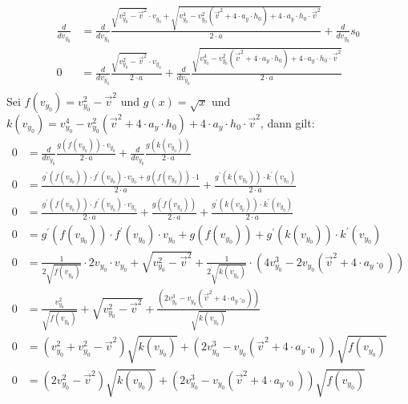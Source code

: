 \documentclass[sectionformat = aufgabe]{gadsescript}
\begin{document}
\begin{enumerate}[label=\alph*)]
		\begin{align*}
			\frac{d}{dv_{y_0}} &= \frac{d}{dv_{y_0}}  \frac{\sqrt{v_{y_0}^2 - \vec v^2 } \cdot v_{y_0} + \sqrt{v_{y_0}^4 - v_{y_0}^2 \left( \vec v^2 + 4 \cdot a_y \cdot h_0 \right) + 4\cdot a_y\cdot h_0 \cdot \vec v^2}}{2\cdot a} + \frac{d}{dv_{y_0}}s_0\\
			0 &= \frac{d}{dv_{y_0}}  \frac{\sqrt{v_{y_0}^2 - \vec v^2 } \cdot v_{y_0}}{2\cdot a} + \frac{d}{dv_{y_0}}\frac{\sqrt{v_{y_0}^4 - v_{y_0}^2 \left( \vec v^2 + 4 \cdot a_y \cdot h_0 \right) + 4\cdot a_y\cdot h_0 \cdot \vec v^2}}{2\cdot a} \\
		\end{align*}
		Sei $ f(v_{y_0}) = v_{y_0}^2 - \vec v^2 $ und $ g(x) = \sqrt{x} $ und $ k(v_{y_0}) = {v_{y_0}^4 - v_{y_0}^2 \left( \vec v^2 + 4 \cdot a_y \cdot h_0 \right) + 4\cdot a_y\cdot h_0 \cdot \vec v^2} $, dann gilt:
		\begin{align*}
			0 &= \frac{d}{dv_{y_0}}  \frac{g(f(v_{y_0})) \cdot v_{y_0}}{2\cdot a} + \frac{d}{dv_{y_0}}\frac{g(k(v_{y_0})) }{2\cdot a} \\
			0 &=  \frac{g^\prime(f(v_{y_0}))\cdot f^\prime(v_{y_0}) \cdot v_{y_0} + g(f(v_{y_0})) \cdot 1}{2\cdot a} + \frac{g^\prime(k(v_{y_0}))\cdot k^\prime(v_{y_0}) }{2\cdot a} \\
			0 &=  \frac{g^\prime(f(v_{y_0}))\cdot f^\prime(v_{y_0}) \cdot v_{y_0}}{2\cdot a} + \frac{g(f(v_{y_0})) }{2\cdot a} + \frac{g^\prime(k(v_{y_0}))\cdot k^\prime(v_{y_0}) }{2\cdot a} \\
			0 &=  g^\prime(f(v_{y_0}))\cdot f^\prime(v_{y_0}) \cdot v_{y_0} + g(f(v_{y_0})) + g^\prime(k(v_{y_0}))\cdot k^\prime(v_{y_0})  \\
			0 &=  \frac{1}{2\sqrt{f(v_{y_0})}}\cdot 2v_{y_0} \cdot v_{y_0} + \sqrt{v_{y_0}^2 - \vec v^2} + \frac{1}{2 \sqrt{k(v_{y_0})}} \cdot (4 v_{y_0}^3 - 2v_{y_0} \left ( \vec v ^2 + 4 \cdot a_y \cdot_0 \right))  \\
			0 &=  \frac{v_{y_0}^2}{\sqrt{f(v_{y_0})}} + \sqrt{v_{y_0}^2 - \vec v^2} + \frac{(2 v_{y_0}^3 - v_{y_0} \left ( \vec v ^2 + 4 \cdot a_y \cdot_0 \right))}{\sqrt{k(v_{y_0})}}  \\
			0 &=  \left( v_{y_0}^2 + v_{y_0}^2 - \vec v^2 \right) \sqrt{k(v_{y_0})} + (2 v_{y_0}^3 - v_{y_0} \left ( \vec v ^2 + 4 \cdot a_y \cdot_0 \right))\sqrt{f(v_{y_0})}  \\
			0 &=  \left( 2v_{y_0}^2 - \vec v^2 \right) \sqrt{k(v_{y_0})} + (2 v_{y_0}^3 - v_{y_0} \left ( \vec v ^2 + 4 \cdot a_y \cdot_0 \right))\sqrt{f(v_{y_0})}  \\
		\end{align*}

\end{enumerate}
\end{document}
